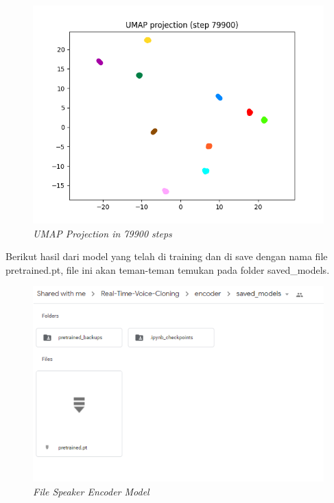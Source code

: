 \begin{enumerate}
\begin{figure}[H]
    \centering
    \includegraphics[scale=0.65]{figures/hasil9}
    \caption{\textit{UMAP Projection in 79900 steps}}
    \label{hasil9}
\end{figure}

Berikut hasil dari model yang telah di training dan di save dengan nama file pretrained.pt, file ini akan teman-teman temukan pada folder saved\_models.
\begin{figure}[H]
    \centering
    \includegraphics[scale=0.65]{figures/hasil11}
    \caption{\textit{File Speaker Encoder Model}}
    \label{hasil11}
\end{figure}


\end{enumerate}
